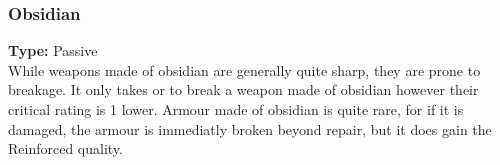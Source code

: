 \subsubsection{Obsidian}
\label{iqty:obsidian}
\textbf{Type:} Passive\\
While weapons made of obsidian are generally quite sharp, they are prone to breakage.
It only takes \threat\threat\threat or \despair to break a weapon made of obsidian
however their critical rating is 1 lower. Armour made of obsidian is quite rare, for
if it is damaged, the armour is immediatly broken beyond repair, but it does gain
the Reinforced quality.

